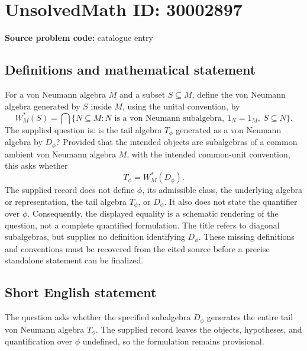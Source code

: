 \documentclass[11pt]{article}
\begin{document}
\section*{UnsolvedMath ID: 30002897}
\textbf{Source problem code:} catalogue entry
\subsection{Definitions and mathematical statement}
For a von Neumann algebra \(M\) and a subset \(S\subseteq M\), define the von Neumann algebra generated by \(S\) inside \(M\), using the unital convention, by
\[
W_M^*(S)=\bigcap\{N\subseteq M:N\text{ is a von Neumann subalgebra},\ 1_N=1_M,\ S\subseteq N\}.
\]
The supplied question is: is the tail algebra \(T_\phi\) generated as a von Neumann algebra by \(D_\phi\)? Provided that the intended objects are subalgebras of a common ambient von Neumann algebra \(M\), with the intended common-unit convention, this asks whether
\[
T_\phi=W_M^*(D_\phi).
\]
The supplied record does not define \(\phi\), its admissible class, the underlying algebra or representation, the tail algebra \(T_\phi\), or \(D_\phi\). It also does not state the quantifier over \(\phi\). Consequently, the displayed equality is a schematic rendering of the question, not a complete quantified formulation. The title refers to diagonal subalgebras, but supplies no definition identifying \(D_\phi\). These missing definitions and conventions must be recovered from the cited source before a precise standalone statement can be finalized.
\subsection{Short English statement}
The question asks whether the specified subalgebra \(D_\phi\) generates the entire tail von Neumann algebra \(T_\phi\). The supplied record leaves the objects, hypotheses, and quantification over \(\phi\) undefined, so the formulation remains provisional.
\end{document}

